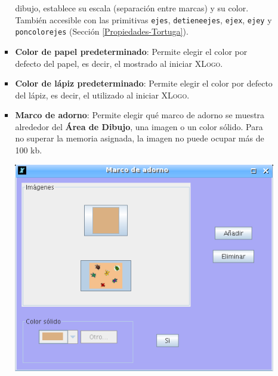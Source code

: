 \begin{itemize}
\begin{itemize}
\begin{itemize}
                  dibujo, establece su escala (separaci\'on entre marcas) y
                  su color. Tambi\'en accesible con las primitivas
                  \texttt{ejes},
                  \texttt{detieneejes},
                  \texttt{ejex},
                  \texttt{ejey} y
                  \texttt{poncolorejes}
                  (Secci\'on \ref{Propiedades-Tortuga}).
               \item \textbf{Color de papel predeterminado}:
                   Permite elegir el color
                  por defecto del papel, es decir, el mostrado al iniciar
                  \textsc{XLogo}. 
               \item \textbf{Color de l\'apiz predeterminado}:
                   Permite elegir el color
                  por defecto del l\'apiz, es decir, el utilizado al iniciar
                  \textsc{XLogo}.
               \item \textbf{Marco de adorno}:
                   Permite elegir qu\'e marco de adorno
                  se muestra alrededor del \textbf{\'Area de Dibujo}, una
                  imagen o un color s\'olido. Para no superar la memoria
                  asignada, la imagen no puede ocupar m\'as de 100 kb.
                  \begin{center}
                   \includegraphics[scale=0.5]{Imagenes/03_Opciones-Menu/Preferencias_Marco.png}

\end{center}
\end{itemize}
\end{itemize}
\end{itemize}

